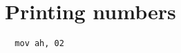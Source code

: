 \documentclass[main.tex]{subfiles}
\begin{document}
\chapter{Printing numbers}

\begin{verbatim}
  mov ah, 02
\end{verbatim}
\end{document}
